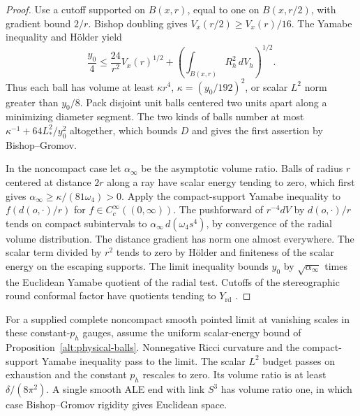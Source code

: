 \begin{proof}
Use a cutoff supported on \(B(x,r)\), equal to one on \(B(x,r/2)\),
with gradient bound \(2/r\). Bishop doubling gives
\(V_x(r/2)\ge V_x(r)/16\). The Yamabe inequality and Hölder yield
\[
 \frac{y_0}{4}\le \frac{24}{r^2}V_x(r)^{1/2}
 +\left(\int_{B(x,r)}R_h^2\,dV_h\right)^{1/2}.
\]
Thus each ball has volume at least \(\kappa r^4\),
\(\kappa=(y_0/192)^2\), or scalar \(L^2\) norm greater than
\(y_0/8\). Pack disjoint unit balls centered two units apart along a
minimizing diameter segment. The two kinds of balls number at most
\(\kappa^{-1}+64L_*^2/y_0^2\) altogether, which bounds \(D\) and gives
the first assertion by Bishop--Gromov.

In the noncompact case let \(\alpha_\infty\) be the asymptotic
volume ratio. Balls of radius \(r\) centered at distance \(2r\) along
a ray have scalar energy tending to zero, which first gives
\(\alpha_\infty\ge\kappa/(81\omega_4)>0\).
Apply the compact-support Yamabe inequality to \(f(d(o,\cdot)/r)\)
for \(f\in C_c^\infty((0,\infty))\). The pushforward of
\(r^{-4}dV\) by \(d(o,\cdot)/r\) tends on compact subintervals to
\(\alpha_\infty\,d(\omega_4s^4)\), by convergence of the radial volume
distribution. The distance gradient has norm one almost everywhere.
The scalar term divided by \(r^2\) tends to zero by Hölder and
finiteness of the scalar energy on the escaping supports. The limit
inequality bounds \(y_0\) by \(\sqrt{\alpha_\infty}\) times the
Euclidean Yamabe quotient of the radial test. Cutoffs of the
stereographic round conformal factor have quotients tending to
\(Y_{\mathrm{rd}}\) \cite[\S3, Theorems 3.2--3.3]{LeeParker1987Yamabe}.
\end{proof}

For a supplied complete noncompact smooth pointed limit at
vanishing scales in these constant-\(p_h\) gauges, assume the
uniform scalar-energy bound of Proposition~\ref{alt:physical-balls}.
Nonnegative Ricci curvature and the compact-support Yamabe
inequality pass to the limit. The
scalar \(L^2\) budget passes on exhaustion and the constant \(p_h\)
rescales to zero. Its volume ratio is at least
\(\delta/(8\pi^2)\). A single smooth ALE end with link \(S^3\)
has volume ratio one, in which case Bishop--Gromov rigidity gives
Euclidean space.

